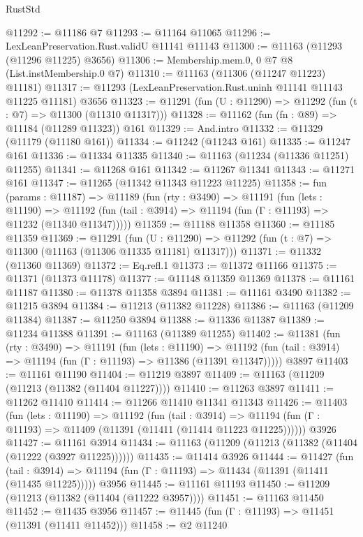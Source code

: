\begin{lexlean}{RustStd}
\begin{coremodule}
@11292 := @11186 @7
@11293 := @11164 @11065
@11296 := LexLeanPreservation.Rust.validU @11141 @11143
@11300 := @11163 (@11293 (@11296 @11225) @3656)
@11306 := Membership.mem.{0, 0} @7 @8 (List.instMembership.{0} @7)
@11310 := @11163 (@11306 (@11247 @11223) @11181)
@11317 := @11293 (LexLeanPreservation.Rust.uninh @11141 @11143 @11225 @11181) @3656
@11323 := @11291 (fun (U : @11290) => @11292 (fun (t : @7) => @11300 (@11310 @11317)))
@11328 := @11162 (fun (fn : @89) => @11184 (@11289 @11323)) @161
@11329 := And.intro
@11332 := @11329 (@11179 (@11180 @161))
@11334 := @11242 (@11243 @161)
@11335 := @11247 @161
@11336 := @11334 @11335
@11340 := @11163 (@11234 (@11336 @11251) @11255)
@11341 := @11268 @161
@11342 := @11267 @11341
@11343 := @11271 @161
@11347 := @11265 (@11342 @11343 @11223 @11225)
@11358 := fun (params : @11187) =>
  @11189
    (fun (rty : @3490) =>
    @11191
      (fun (lets : @11190) =>
      @11192 (fun (tail : @3914) => @11194 (fun (Γ : @11193) => @11232 (@11340 @11347)))))
@11359 := @11188 @11358
@11360 := @11185 @11359
@11369 := @11291
    (fun (U : @11290) => @11292 (fun (t : @7) => @11300 (@11163 (@11306 @11335 @11181) @11317)))
@11371 := @11332 (@11360 @11369)
@11372 := Eq.refl.{1}
@11373 := @11372 @11166
@11375 := @11371 (@11373 @11178)
@11377 := @11148 @11359 @11369
@11378 := @11161 @11187
@11380 := @11378 @11358 @3894
@11381 := @11161 @3490
@11382 := @11215 @3894
@11384 := @11213 (@11382 @11228)
@11386 := @11163 (@11209 @11384)
@11387 := @11250 @3894
@11388 := @11336 @11387
@11389 := @11234 @11388
@11391 := @11163 (@11389 @11255)
@11402 := @11381
    (fun (rty : @3490) =>
    @11191
      (fun (lets : @11190) =>
      @11192 (fun (tail : @3914) => @11194 (fun (Γ : @11193) => @11386 (@11391 @11347)))))
    @3897
@11403 := @11161 @11190
@11404 := @11219 @3897
@11409 := @11163 (@11209 (@11213 (@11382 (@11404 @11227))))
@11410 := @11263 @3897
@11411 := @11262 @11410
@11414 := @11266 @11410 @11341 @11343
@11426 := @11403
    (fun (lets : @11190) =>
    @11192
      (fun (tail : @3914) =>
      @11194 (fun (Γ : @11193) => @11409 (@11391 (@11411 (@11414 @11223 @11225))))))
    @3926
@11427 := @11161 @3914
@11434 := @11163 (@11209 (@11213 (@11382 (@11404 (@11222 (@3927 @11225))))))
@11435 := @11414 @3926
@11444 := @11427
    (fun (tail : @3914) => @11194 (fun (Γ : @11193) => @11434 (@11391 (@11411 (@11435 @11225)))))
    @3956
@11445 := @11161 @11193
@11450 := @11209 (@11213 (@11382 (@11404 (@11222 @3957))))
@11451 := @11163 @11450
@11452 := @11435 @3956
@11457 := @11445 (fun (Γ : @11193) => @11451 (@11391 (@11411 @11452)))
@11458 := @2 @11240

\end{coremodule}
\end{lexlean}

